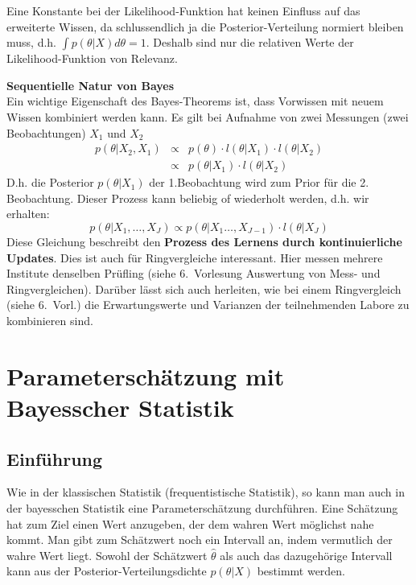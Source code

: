 Eine Konstante  bei der Likelihood-Funktion hat keinen Einfluss auf das erweiterte 
Wissen, da schlussendlich ja die Posterior-Verteilung normiert bleiben muss, d.h.
$\int p(\theta|X) d\theta =1$. Deshalb sind nur die relativen Werte der Likelihood-Funktion von Relevanz. 

\textbf{Sequentielle Natur von Bayes} \\
Ein wichtige Eigenschaft des Bayes-Theorems ist, dass Vorwissen mit
neuem Wissen kombiniert werden kann. Es gilt bei Aufnahme von zwei
Messungen (zwei Beobachtungen) $X_1$ und $X_2$
\[
\begin{array}{rcl}
p(\theta|X_2,X_1) &\propto& p(\theta) \cdot l(\theta|X_1) \cdot l(\theta | X_2) \\
&\propto& p(\theta|X_1) \cdot l(\theta|X_2)
\end{array}
\]
D.h. die Posterior $p(\theta|X_1)$ der 1.Beobachtung wird zum Prior für die 
2. Beobachtung. Dieser Prozess kann beliebig of wiederholt werden, d.h. wir
erhalten: 
\begin{equation}
p(\theta |X_1,\hdots,X_J) \propto p(\theta | X_1\hdots, X_{J-1}) \cdot l(\theta | X_J) 
\label{eq:Bayes_sequentiell}
\end{equation}
Diese Gleichung beschreibt den \textbf{Prozess des Lernens durch kontinuierliche Updates}. Dies ist auch für Ringvergleiche interessant. Hier messen mehrere 
Institute denselben Prüfling (siehe 6.~Vorlesung \glqq Auswertung von Mess- und Ringvergleichen\grqq). Darüber lässt sich auch herleiten, wie bei einem Ringvergleich (siehe 6.~Vorl.) die Erwartungswerte und Varianzen der teilnehmenden Labore zu kombinieren sind.

\section{Parameterschätzung mit Bayesscher Statistik}
\subsection{Einführung}
Wie in der klassischen Statistik (frequentistische Statistik), so kann man auch in der bayes\-schen Statistik eine Parameterschätzung durchführen. Eine Schätzung hat zum Ziel einen Wert anzugeben, der dem wahren Wert möglichst nahe kommt. Man gibt zum Schätzwert noch ein Intervall  an, indem vermutlich der wahre Wert liegt. Sowohl der Schätzwert $\hat{\theta}$ als auch das dazugehörige Intervall kann aus der Posterior-Ver\-teilungs\-dichte $p(\theta|X)$ bestimmt werden. 
